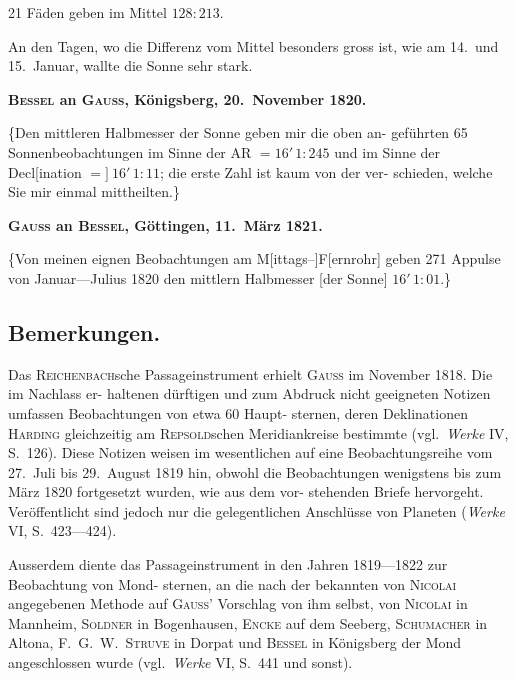 \documentclass[12pt,a4paper]{article}
\theoremstyle{plain}
\theoremstyle{definition}
\theoremstyle{remark}
\begin{document}
\begin{center}
21 F\"{a}den geben im Mittel $128\!\!:\!\!213$.
\end{center}

An den Tagen, wo die Differenz vom Mittel besonders gross ist, wie am 14.\ und 15.\ Januar, wallte die Sonne sehr stark.

\medskip
\begin{center}
\textbf{\textsc{Bessel} an \textsc{Gauss}, K\"{o}nigsberg, 20.\ November 1820.}
\end{center}

\medskip
\{Den mittleren Halbmesser der Sonne geben mir die oben an-
gef\"{u}hrten 65 Sonnenbeobachtungen im Sinne der AR $= 16'\,1\!\!:\!\!245$ und im
Sinne der Decl[ination $=]\ 16'\,1\!\!:\!\!11$; die erste Zahl ist kaum von der ver-
schieden, welche Sie mir einmal mittheilten.\}

\medskip
\begin{center}
\textbf{\textsc{Gauss} an \textsc{Bessel}, G\"{o}ttingen, 11.\ M\"{a}rz 1821.}
\end{center}

\medskip
\{Von meinen eignen Beobachtungen am M[ittags--]F[ernrohr]
geben 271 Appulse von Januar---Julius 1820 den mittlern Halbmesser [der
Sonne] $16'\,1\!\!:\!\!01$.\}

\medskip
\subsection*{Bemerkungen.}
Das \textsc{Reichenbach}sche Passageinstrument erhielt \textsc{Gauss} im November 1818. Die im Nachlass er-
haltenen d\"{u}rftigen und zum Abdruck nicht geeigneten Notizen umfassen Beobachtungen von etwa 60 Haupt-
sternen, deren Deklinationen \textsc{Harding} gleichzeitig am \textsc{Repsold}schen Meridiankreise bestimmte (vgl.\ \textit{Werke}
IV, S.\ 126). Diese Notizen weisen im wesentlichen auf eine Beobachtungsreihe vom 27.\ Juli bis 29.\ August
1819 hin, obwohl die Beobachtungen wenigstens bis zum M\"{a}rz 1820 fortgesetzt wurden, wie aus dem vor-
stehenden Briefe hervorgeht. Ver\"{o}ffentlicht sind jedoch nur die gelegentlichen Anschl\"{u}sse von Planeten
(\textit{Werke} VI, S.\ 423---424).

Ausserdem diente das Passageinstrument in den Jahren 1819---1822 zur Beobachtung von Mond-
sternen, an die nach der bekannten von \textsc{Nicolai} angegebenen Methode auf \textsc{Gauss}' Vorschlag von ihm
selbst, von \textsc{Nicolai} in Mannheim, \textsc{Soldner} in Bogenhausen, \textsc{Encke} auf dem Seeberg, \textsc{Schumacher} in
Altona, F.\ G.\ W.\ \textsc{Struve} in Dorpat und \textsc{Bessel} in K\"{o}nigsberg der Mond angeschlossen wurde (vgl.\ \textit{Werke}
VI, S.\ 441 und sonst).
\end{document}

